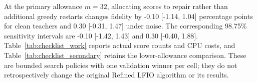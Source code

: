 At the primary allowance $m=32$, allocating scores to repair rather than additional greedy restarts changes fidelity by -0.10 [-1.14, 1.04] percentage points for clean teachers and 0.30 [-0.31, 1.47] under noise. The corresponding 98.75\% sensitivity intervals are -0.10 [-1.42, 1.43] and 0.30 [-0.40, 1.88]. Table~\ref{tab:checklist_work} reports actual score counts and CPU costs, and Table~\ref{tab:checklist_secondary} retains the lower-allowance comparison. These are bounded search policies with one validation winner per cell; they do not retrospectively change the original Refined LFIO algorithm or its results.
